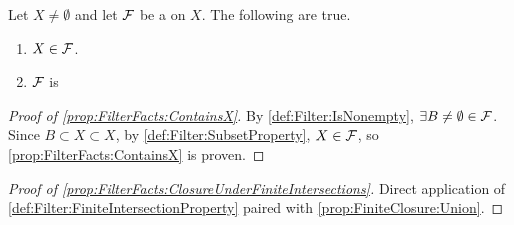 \begin{prop}
\label{prop:FilterFacts}
    Let $X \neq \emptyset$ and let $\mathcal{F}$ be a 
    \Filter on $X$. The following are true. 
    \begin{enumerate}[label=(\roman*), ref={\ref{prop:FilterFacts}~\roman*}]
        \item \label{prop:FilterFacts:ContainsX} $X \in \mathcal{F}$. 
        \item \label{prop:FilterFacts:ClosureUnderFiniteIntersections} $\mathcal{F}$ is \ClosedUnderFiniteIntersections
    \end{enumerate}
    \begin{proof}[Proof of \ref{prop:FilterFacts:ContainsX}]
        By \ref{def:Filter:IsNonempty}, 
        $\exists B \neq \emptyset \in \mathcal{F}$. 
        Since $B \subset X \subset X$, by 
        \ref{def:Filter:SubsetProperty}, 
        $X \in \mathcal{F}$, so \ref{prop:FilterFacts:ContainsX} is proven. 
    \end{proof}
    \begin{proof}[Proof of \ref{prop:FilterFacts:ClosureUnderFiniteIntersections}]
        Direct application of \ref{def:Filter:FiniteIntersectionProperty} paired with 
        \ref{prop:FiniteClosure:Union}.
    \end{proof}
\end{prop}

